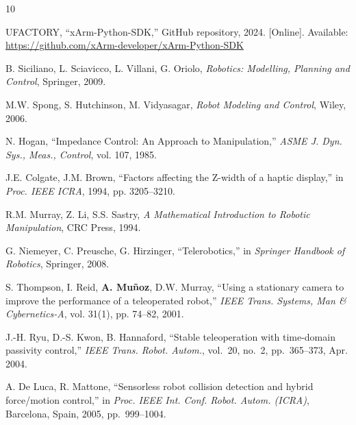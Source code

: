 \documentclass[journal,10pt,twoside]{IEEEtran}
\begin{document}
\begin{thebibliography}{10}

  UFACTORY, ``xArm-Python-SDK,''
  GitHub repository, 2024.
  [Online]. Available: \url{https://github.com/xArm-developer/xArm-Python-SDK}

  B. Siciliano, L. Sciavicco, L. Villani, G. Oriolo,
  \textit{Robotics: Modelling, Planning and Control},
  Springer, 2009.

  M.W. Spong, S. Hutchinson, M. Vidyasagar,
  \textit{Robot Modeling and Control},
  Wiley, 2006.

  N. Hogan,
  ``Impedance Control: An Approach to Manipulation,''
  \textit{ASME J. Dyn. Sys., Meas., Control},
  vol. 107, 1985.

  J.E. Colgate, J.M. Brown,
  ``Factors affecting the Z-width of a haptic display,''
  in \textit{Proc. IEEE ICRA}, 1994, pp. 3205--3210.

  R.M. Murray, Z. Li, S.S. Sastry,
  \textit{A Mathematical Introduction to Robotic Manipulation},
  CRC Press, 1994.

  G. Niemeyer, C. Preusche, G. Hirzinger,
  ``Telerobotics,''
  in \textit{Springer Handbook of Robotics},
  Springer, 2008.

  S. Thompson, I. Reid, \textbf{A. Muñoz}, D.W. Murray,
  ``Using a stationary camera to improve the performance
  of a teleoperated robot,''
  \textit{IEEE Trans. Systems, Man \& Cybernetics-A},
  vol. 31(1), pp. 74--82, 2001.

  J.-H. Ryu, D.-S. Kwon, B. Hannaford,
  ``Stable teleoperation with time-domain passivity control,''
  \textit{IEEE Trans. Robot. Autom.},
  vol.~20, no.~2, pp.~365--373, Apr. 2004.

  A. De Luca, R. Mattone,
  ``Sensorless robot collision detection and hybrid force/motion control,''
  in \textit{Proc. IEEE Int. Conf. Robot. Autom. (ICRA)},
  Barcelona, Spain, 2005, pp.~999--1004.

\end{thebibliography}

\appendix
\end{document}
